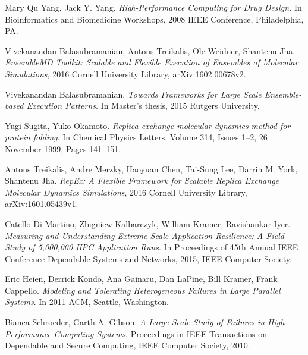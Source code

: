 \documentclass[10pt]{ruthesis}
\begin{document}
\def\aap{{A\&A}}
\def\aas{{A\&AS}}
\def\aj{{AJ}}
\def\araa{{ARA\&A}}
\def\apj{{ApJ}}
\def\apjl{{ApJ}}
\def\apjs{{ApJS}}
\def\baas{{BAAS}}
\def\mnras{{MNRAS}}
\def\nat{{Nature}}
\def\pasp{{PASP}}

\clearpage
{}



\renewcommand{\bibname}{References}

\begin{thebibliography}{30}

Mary Qu Yang, Jack Y. Yang.
\textit{High-Performance Computing for Drug Design.}
In Bioinformatics and Biomedicine Workshops, 2008 IEEE Conference,
Philadelphia, PA.

Vivekanandan Balasubramanian, Antons Treikalis, Ole Weidner, Shantenu Jha.
\textit{EnsembleMD Toolkit: Scalable and Flexible Execution of Ensembles of Molecular Simulations}, 2016 Cornell University Library, arXiv:1602.00678v2.

Vivekanandan Balasubramanian.
\textit{Towards Frameworks for Large Scale Ensemble-based Execution Patterns}.
In Master's thesis, 2015 Rutgers University.

Yugi Sugita, Yuko Okamoto.
\textit{Replica-exchange molecular dynamics method for protein folding}.
In Chemical Physics Letters, Volume 314, Issues 1–2, 26 November 1999, Pages 141–151.

Antons Treikalis, Andre Merzky, Haoyuan Chen, Tai-Sung Lee, Darrin M. York, Shantenu Jha.
\textit{RepEx: A Flexible Framework for Scalable Replica Exchange Molecular Dynamics Simulations}, 2016 Cornell University Library, arXiv:1601.05439v1.

Catello Di Martino, Zbigniew Kalbarczyk, William Kramer, Ravishankar Iyer.
\textit{Measuring and Understanding Extreme-Scale Application Resilience: A Field Study of 5,000,000 HPC Application Runs}.
In Proceedings of 45th Annual IEEE Conference Dependable Systems and Networks, 2015, IEEE Computer Society.

Eric Heien, Derrick Kondo, Ana Gainaru, Dan LaPine, Bill Kramer, Frank Cappello.
\textit{Modeling and Tolerating Heterogeneous Failures in Large Parallel Systems}.
In 2011 ACM, Seattle, Washington.

Bianca Schroeder, Garth A. Gibson.
\textit{A Large-Scale Study of Failures in High-Performance Computing Systems}.
Proceedings in IEEE Transactions on Dependable and Secure Computing, IEEE Computer Society, 2010.


\end{thebibliography}
\end{document}
